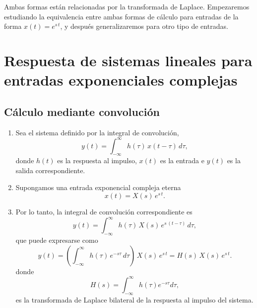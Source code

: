 \documentclass[11pt,a4paper,openany]{book}
\begin{document}
Ambas formas están relacionadas por la transformada de Laplace. Empezaremos estudiando la equivalencia entre ambas formas de cálculo para entradas de la forma $x(t) = e^{s \,  t}$, y despu\'{e}s generalizaremos para otro tipo de entradas.

\section{Respuesta de sistemas lineales para entradas exponenciales complejas}

\subsection{C\'{a}lculo mediante convoluci\'{o}n}

\begin{enumerate}
	\item Sea el sistema definido por la integral de convoluci\'{o}n, 
	\begin{equation}
		y\left( t\right) =
		\int_{-\infty }^{\infty }h\left( \tau \right) \, x\left(t-\tau
		\right) \, d\tau ,
	\end{equation}
	donde $h\left( t\right) $ es la respuesta al impulso, $x\left( t\right) $ es la entrada e $y\left( t\right) $ es la salida correspondiente.
	
	\item Supongamos una entrada exponencial compleja eterna
	\begin{equation}
		x\left( t\right) =X(s) \, e^{s \, t}.
	\end{equation}
	
	\item Por lo tanto, la integral de convoluci\'{o}n correspondiente es 
	\begin{equation}
		y\left( t\right) =\int_{-\infty }^{\infty }h\left( \tau \right) \,
		X(s) \, e^{s \, \left(t-\tau \right) } \, d\tau ,
	\end{equation}
	que puede expresarse como 
	\begin{equation}
		y\left( t\right) =
		\left( \int_{-\infty }^{\infty }h\left( \tau\right) \, e^{-s\tau }
		\, d\tau \right) \,  X(s) \, e^{s \, t} =
		H\left( s\right) \, X(s) \, e^{s \, t}.
	\end{equation}
	donde 
	\begin{equation}
		H\left( s\right) =\int_{-\infty }^{\infty }h\left( \tau \right) e^{-s\tau}d\tau,
		\label{laplacebilateral}
	\end{equation}
	es la transformada de Laplace bilateral de la respuesta al impulso del sistema.
	

\end{enumerate}
\end{document}
